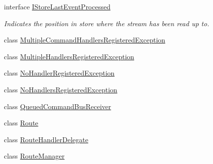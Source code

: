 \begin{DoxyCompactItemize}
interface \hyperlink{interfaceCqrs_1_1Bus_1_1IStoreLastEventProcessed}{I\+Store\+Last\+Event\+Processed}
\begin{DoxyCompactList}\small\item\em Indicates the position in store where the stream has been read up to. \end{DoxyCompactList}\item 
class \hyperlink{classCqrs_1_1Bus_1_1MultipleCommandHandlersRegisteredException}{Multiple\+Command\+Handlers\+Registered\+Exception}
\item 
class \hyperlink{classCqrs_1_1Bus_1_1MultipleHandlersRegisteredException}{Multiple\+Handlers\+Registered\+Exception}
\item 
class \hyperlink{classCqrs_1_1Bus_1_1NoHandlerRegisteredException}{No\+Handler\+Registered\+Exception}
\item 
class \hyperlink{classCqrs_1_1Bus_1_1NoHandlersRegisteredException}{No\+Handlers\+Registered\+Exception}
\item 
class \hyperlink{classCqrs_1_1Bus_1_1QueuedCommandBusReceiver}{Queued\+Command\+Bus\+Receiver}
\item 
class \hyperlink{classCqrs_1_1Bus_1_1Route}{Route}
\item 
class \hyperlink{classCqrs_1_1Bus_1_1RouteHandlerDelegate}{Route\+Handler\+Delegate}
\item 
class \hyperlink{classCqrs_1_1Bus_1_1RouteManager}{Route\+Manager}
\end{DoxyCompactItemize}
